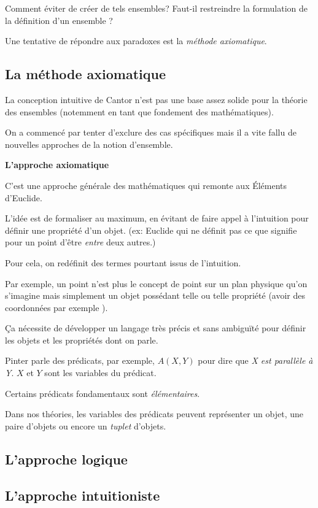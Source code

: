 \documentclass[fleqn,a4paper,nobib]{tufte-handout}
\begin{document}
Comment éviter de créer de tels ensembles? Faut-il restreindre la
formulation de la définition d'un ensemble ? 

Une tentative de répondre aux paradoxes est la \textit{méthode axiomatique}.

\subsection{La méthode axiomatique}

La conception intuitive de Cantor n'est pas une base assez solide
pour la théorie des ensembles (notemment en tant que fondement des
mathématiques).

On a commencé par tenter d'exclure des cas spécifiques
 mais il a
vite fallu de nouvelles approches de la notion d'ensemble.

\textbf{L'approche axiomatique} 

C'est une approche générale des mathématiques qui remonte aux
Éléments d'Euclide.

L'idée est de formaliser au maximum, en évitant de faire appel à
l'intuition pour définir une propriété d'un objet. (ex: Euclide
qui ne définit pas ce que signifie pour un point d'être \textit{entre}
deux autres.)

Pour cela, on redéfinit des termes pourtant issus de l'intuition.

Par exemple, un point n'est plus le concept de point sur un plan
physique qu'on s'imagine mais simplement un objet possédant telle
ou telle propriété (avoir des coordonnées par exemple
).

Ça nécessite de développer un langage très précis et sans
ambiguïté pour définir les objets et les propriétés dont on parle.

Pinter parle des prédicats, par exemple, $A(X, Y)$ pour dire
que \textit{X est parallèle à Y}. $X$ et $Y$ sont les
variables du prédicat. 

Certains prédicats fondamentaux sont \textit{élémentaires}.

Dans nos théories, les variables des prédicats peuvent représenter
un objet, une paire d'objets ou encore un \textit{tuplet}
 d'objets.

\subsection{L'approche logique}

\subsection{L'approche intuitioniste}
\end{document}
